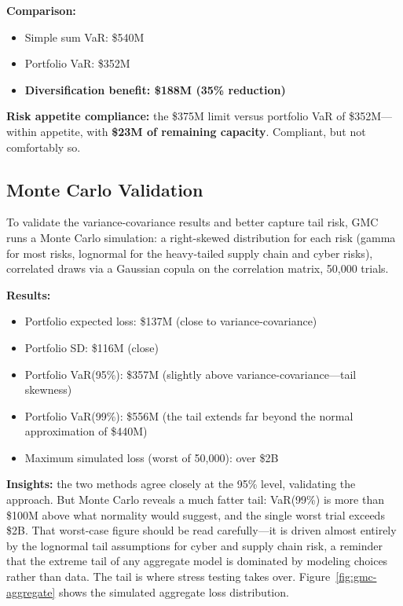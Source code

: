 \documentclass[11pt,openany]{book}
\providecommand{\tightlist}{\setlength{\itemsep}{0pt}\setlength{\parskip}{0pt}}
\begin{document}
\textbf{Comparison:}
\begin{itemize}\tightlist
  \item Simple sum VaR: \$540M
  \item Portfolio VaR: \$352M
  \item \textbf{Diversification benefit: \$188M (35\% reduction)}
\end{itemize}

\textbf{Risk appetite compliance:} the \$375M limit versus portfolio VaR of
\$352M---within appetite, with \textbf{\$23M of remaining capacity}.
Compliant, but not comfortably so.

\subsection{Monte Carlo Validation}
\label{subsec:gmc-monte-carlo}

To validate the variance-covariance results and better capture tail risk, GMC
runs a Monte Carlo simulation: a right-skewed distribution for each risk
(gamma for most risks, lognormal for the heavy-tailed supply chain and cyber
risks), correlated draws via a Gaussian copula on the correlation matrix,
50{,}000 trials.

\textbf{Results:}
\begin{itemize}\tightlist
  \item Portfolio expected loss: \$137M (close to variance-covariance)
  \item Portfolio SD: \$116M (close)
  \item Portfolio VaR(95\%): \$357M (slightly above
        variance-covariance---tail skewness)
  \item Portfolio VaR(99\%): \$556M (the tail extends far beyond the normal
        approximation of \$440M)
  \item Maximum simulated loss (worst of 50{,}000): over \$2B
\end{itemize}

\textbf{Insights:} the two methods agree closely at the 95\% level, validating
the approach. But Monte Carlo reveals a much fatter tail: VaR(99\%) is more
than \$100M above what normality would suggest, and the single worst trial
exceeds \$2B. That worst-case figure should be read carefully---it is driven
almost entirely by the lognormal tail assumptions for cyber and supply chain
risk, a reminder that the extreme tail of any aggregate model is dominated by
modeling choices rather than data. The tail is where stress testing takes
over. Figure~\ref{fig:gmc-aggregate} shows the simulated aggregate loss
distribution.
\end{document}
